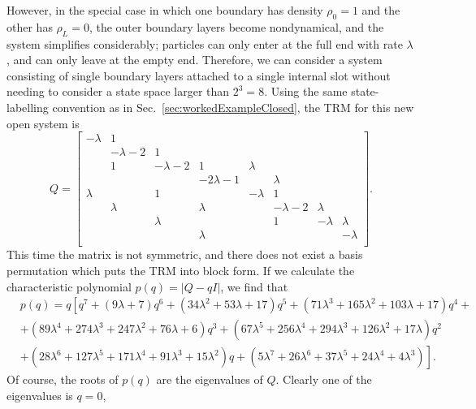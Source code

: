 However, in the special case in which one boundary has density $\rho_0=1$ and the other has
$\rho_L=0$, the outer boundary layers become nondynamical, and the system simplifies considerably;
particles can only enter at the full end with rate $\lambda$, and can only leave at the empty end.
Therefore, we can consider a system consisting of single boundary layers attached to a single internal
slot without needing to consider a state space larger than $2^3=8$. Using the same state-labelling
convention as in Sec.~\ref{sec:workedExampleClosed}, the TRM for this new open system is
\begin{equation}
Q = 
\begin{bmatrix}
 -\lambda  & 1 &   &   &   &   &   &   \\
   & -\lambda -2 & 1 &   &   &   &   &   \\
   & 1 & -\lambda -2 & 1 & \lambda  &   &   &   \\
   &   &   & -2 \lambda -1 &   & \lambda  &   &   \\
 \lambda  &   & 1 &   & -\lambda  & 1 &   &   \\
   & \lambda  &   & \lambda  &   & -\lambda -2 & \lambda  &   \\
   &   & \lambda  &   &   & 1 & -\lambda  & \lambda  \\
   &   &   & \lambda  &   &   &   & -\lambda  \\
\end{bmatrix}.
\end{equation}
This time the matrix is not symmetric, and there does not exist a basis permutation which puts the
TRM into block form. If we calculate the characteristic polynomial $p(q) = |Q - q I|$, we find that
\begin{equation}
\begin{split}
 &p(q) = q \left[ q^7+(9 \lambda +7) q^6+\left(34 \lambda ^2+53 \lambda +17\right) q^5+\left(71 \lambda ^3+165 \lambda ^2+103 \lambda +17\right) q^4+ \right. \\
 &+\left(89 \lambda
   ^4+274 \lambda ^3+247 \lambda ^2+76 \lambda +6\right) q^3+\left(67 \lambda ^5+256 \lambda ^4+294 \lambda ^3+126 \lambda ^2+17 \lambda \right) q^2 \\
  &\left. +\left(28 \lambda ^6+127 \lambda ^5+171 \lambda ^4+91 \lambda ^3+15
   \lambda ^2\right) q + \left(5 \lambda ^7+26 \lambda ^6+37 \lambda ^5+24 \lambda ^4+4 \lambda ^3 \right) \right].
\end{split}
\end{equation}
Of course, the roots of $p(q)$ are the eigenvalues of $Q$. Clearly one of the eigenvalues is $q=0$,
